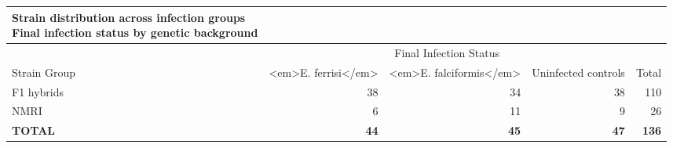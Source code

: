 \begin{longtable}{lrrrr}
\caption*{
{\large Strain distribution across infection groups} \\ 
{\small Final infection status by genetic background}
} \\ 
\toprule
 & \multicolumn{3}{c}{Final Infection Status} &  \\ 
\cmidrule(lr){2-4}
Strain Group & <em>E. ferrisi</em> & <em>E. falciformis</em> & Uninfected controls & Total \\ 
\midrule\addlinespace[2.5pt]
F1 hybrids & 38 & 34 & 38 & 110 \\ 
NMRI & 6 & 11 & 9 & 26 \\ 
\textbf{TOTAL} & \textbf{44} & \textbf{45} & \textbf{47} & \textbf{136} \\ 
\bottomrule
\end{longtable}

